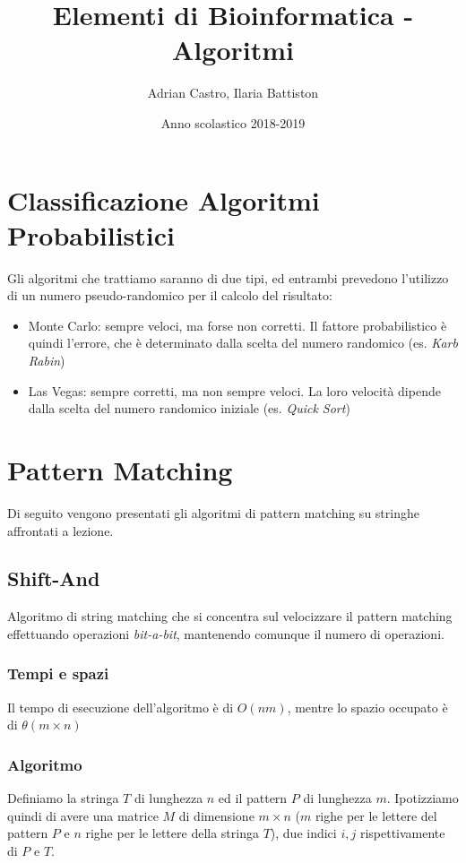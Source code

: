 \documentclass{article}
\title{Elementi di Bioinformatica - Algoritmi}
\author{Adrian Castro, Ilaria Battiston}
\date{Anno scolastico 2018-2019}
\begin{document}
\maketitle

\lfoot{}
\cfoot{}
\rfoot{\thepage}

\newpage
\tableofcontents
\newpage

\section{Classificazione Algoritmi Probabilistici}

Gli algoritmi che trattiamo saranno di due tipi, ed  entrambi prevedono l'utilizzo di un numero pseudo-randomico per il calcolo del risultato:
\begin{itemize}
    \item Monte Carlo: sempre veloci, ma forse non corretti. Il fattore probabilistico è quindi l'errore, che è determinato dalla scelta del numero randomico (es. \textit{Karb Rabin})
    \item Las Vegas: sempre corretti, ma non sempre veloci. La loro velocità dipende dalla scelta del numero randomico iniziale (es. \textit{Quick Sort})
\end{itemize}

\newpage
\section{Pattern Matching}

Di seguito vengono presentati gli algoritmi di pattern matching su stringhe affrontati a lezione.

\subsection{Shift-And}
Algoritmo di string matching che si concentra sul velocizzare il pattern matching effettuando operazioni \textit{bit-a-bit}, mantenendo comunque il numero di operazioni.

\subsubsection{Tempi e spazi}
Il tempo di esecuzione dell'algoritmo è di $O(nm)$, mentre lo spazio occupato è di $\theta (m \times n)$

\subsubsection{Algoritmo}
Definiamo la stringa $T$ di lunghezza $n$ ed il pattern $P$ di lunghezza $m$. Ipotizziamo quindi di avere una matrice $M$ di dimensione $m \times n$ ($m$ righe per le lettere del pattern $P$ e $n$ righe per le lettere della stringa $T$), due indici $i, j$ rispettivamente di $P$ e $T$.
\end{document}
